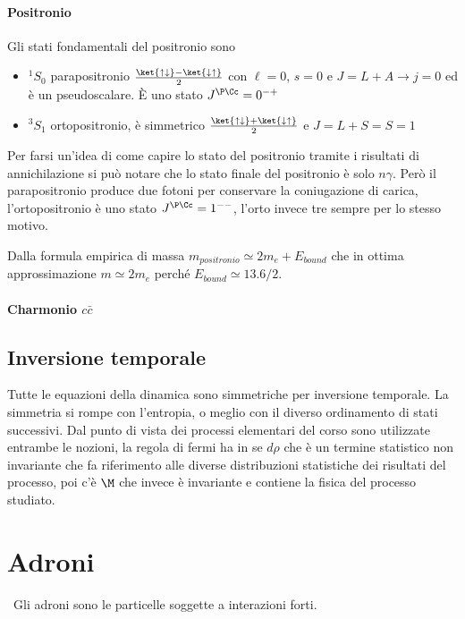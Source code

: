 \documentclass[12pt]{book}
\begin{document}
\subsubsection{Positronio}
Gli stati fondamentali del positronio sono 
\begin{itemize}
	\item $\boxed{^1 S_0}$ parapositronio $\frac{\ket{\uparrow \downarrow } - \ket{\downarrow \uparrow}}{2}$ con $\ell =0$, $s=0$ e $J=L+A \rightarrow j=0$ ed è un pseudoscalare. È uno stato $J^{\P \Cc} = 0^{-+}$
	\item $\boxed{^3 S_1 }$ ortopositronio, è simmetrico $\frac{\ket{\uparrow \downarrow } + \ket{\downarrow \uparrow}}{2}$ e $J=L+S =S=1$
\end{itemize}

Per farsi un'idea di come capire lo stato del positronio tramite i risultati di annichilazione si può notare che lo stato finale del positronio è solo $n \gamma $. Però il parapositronio produce due fotoni per conservare la coniugazione di carica, l'ortopositronio è uno stato $J^{\P \Cc } = 1^{--}$, l'orto invece tre sempre per lo stesso motivo. 

Dalla formula empirica di massa $m_{positronio} \simeq 2 m_e + E_{bound}$ che in ottima approssimazione $m \simeq 2 m_e$ perché $E_{bound} \simeq 13.6/2$. 

\subsubsection{Charmonio $c \bar c$}

\newpage
\section{Inversione temporale}
Tutte le equazioni della dinamica sono simmetriche per inversione temporale. La simmetria si rompe con l'entropia, o meglio con il diverso ordinamento di stati successivi.  Dal punto di vista dei processi elementari del corso sono utilizzate entrambe le nozioni, la regola di fermi ha in se $d \rho$ che è un termine statistico non invariante che fa riferimento alle diverse distribuzioni statistiche dei risultati del processo, poi c'è $\M$ che invece è invariante e contiene la fisica del processo studiato.


\chapter{Adroni}
\
Gli adroni sono le particelle soggette a interazioni forti.
\end{document}
